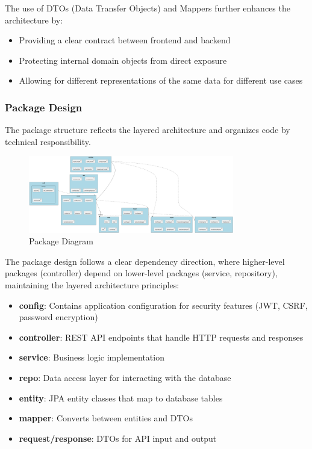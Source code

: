 \documentclass[a4paper,10pt]{article}
\begin{document}
            The use of DTOs (Data Transfer Objects) and Mappers further enhances the architecture by:
            \begin{itemize}
                \item Providing a clear contract between frontend and backend
                \item Protecting internal domain objects from direct exposure
                \item Allowing for different representations of the same data for different use cases
            \end{itemize}
        \subsubsection{Package Design}
            The package structure reflects the layered architecture and organizes code by technical responsibility.

            \begin{figure}[h]
            \centering
            \includegraphics[width=0.8\textwidth]{package_diagram}
            \caption{Package Diagram}
            \end{figure}

            The package design follows a clear dependency direction, where higher-level packages (controller) depend on lower-level packages (service, repository), maintaining the layered architecture principles:

            \begin{itemize}
            \item \textbf{config}: Contains application configuration for security features (JWT, CSRF, password encryption)
            \item \textbf{controller}: REST API endpoints that handle HTTP requests and responses
            \item \textbf{service}: Business logic implementation
            \item \textbf{repo}: Data access layer for interacting with the database
            \item \textbf{entity}: JPA entity classes that map to database tables
            \item \textbf{mapper}: Converts between entities and DTOs
            \item \textbf{request/response}: DTOs for API input and output
            \end{itemize}
\end{document}
